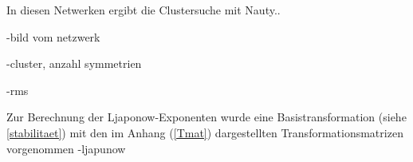 In diesen Netwerken ergibt die Clustersuche mit Nauty..


-bild vom netzwerk

-cluster, anzahl symmetrien

-rms

Zur Berechnung der Ljaponow-Exponenten wurde eine Basistransformation (siehe \ref{stabilitaet}) mit den im Anhang (\ref{Tmat}) dargestellten Transformationsmatrizen vorgenommen \cite{pecora2014,sagenotebook}
-ljapunow

